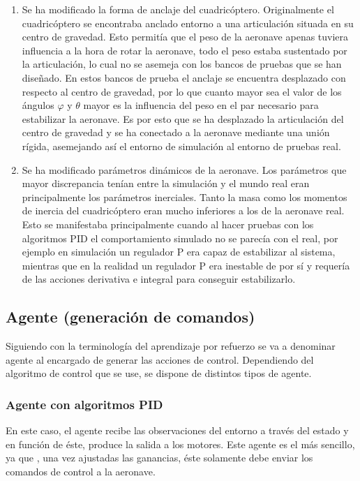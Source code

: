 \begin{enumerate}
	\item Se ha modificado la forma de anclaje del cuadricóptero. Originalmente el cuadricóptero se encontraba anclado entorno a una articulación situada en su centro de gravedad. Esto permitía que el peso de la aeronave apenas tuviera influencia a la hora de rotar la aeronave, todo el peso estaba sustentado por la articulación, lo cual no se asemeja con los bancos de pruebas que se han diseñado. En estos bancos de prueba el anclaje se encuentra desplazado con respecto al centro de gravedad, por lo que cuanto mayor sea el valor de los ángulos $\varphi$ y $\theta$ mayor es la influencia del peso en el par necesario para estabilizar la aeronave. Es por esto que se ha desplazado la articulación del centro de gravedad y se ha conectado a la aeronave mediante una unión rígida, asemejando así el entorno de simulación al entorno de pruebas real.
	\item Se ha modificado parámetros dinámicos de la aeronave. Los parámetros que mayor discrepancia tenían entre la simulación y el mundo real eran principalmente los parámetros inerciales. Tanto la masa como los momentos de inercia del cuadricóptero eran mucho inferiores a los de la aeronave real. Esto se manifestaba principalmente cuando al hacer pruebas con los algoritmos PID el comportamiento simulado no se parecía con el real, por ejemplo en simulación un regulador P era capaz de estabilizar al sistema, mientras que en la realidad un regulador P era inestable de por sí y requería de las acciones derivativa e integral para conseguir estabilizarlo.
\end{enumerate}


 \subsection{Agente (generación de comandos)}
 
 Siguiendo con la terminología del aprendizaje por refuerzo se va a denominar agente al encargado de generar las acciones de control. Dependiendo del algoritmo de control que se use, se dispone de distintos tipos de agente.
 
 \subsubsection{Agente con algoritmos PID}
 En este caso, el agente recibe las observaciones del entorno a través del estado y en función de éste, produce la salida a los motores. Este agente es el más sencillo, ya que , una vez ajustadas las ganancias, éste solamente debe enviar los comandos de control a la aeronave.
 
